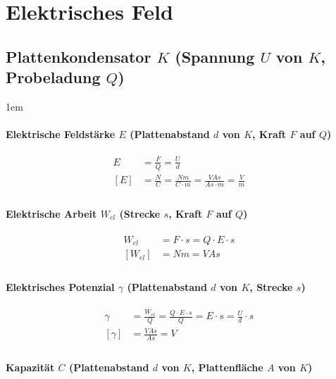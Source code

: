 \section{Elektrisches Feld}

\subsection{Plattenkondensator $K$ (Spannung $U$ von $K$, Probeladung $Q$)}

\leftskip1em
\paragraph{Elektrische Feldstärke $E$ (Plattenabstand $d$ von $K$, Kraft $F$ auf $Q$)}

\begin{align*}
  E &= \frac{F}{Q} = \frac{U}{d} &\\
  [E] &= \frac{N}{C} = \frac{Nm}{C \cdot m} = \frac{VAs}{As \cdot m} = \frac{V}{m} &\\
\end{align*}

\paragraph{Elektrische Arbeit $W_{el}$ (Strecke $s$, Kraft $F$ auf $Q$)}

\begin{align*}
  W_{el} &= F \cdot s = Q \cdot E \cdot s &\\
  [W_{el}] &= Nm = VAs &\\
\end{align*}

\paragraph{Elektrisches Potenzial $\gamma$ (Plattenabstand $d$ von $K$, Strecke $s$)}

\begin{align*}
  \gamma &= \frac{W_{el}}{Q} = \frac{Q \cdot E \cdot s}{Q} = E \cdot s = \frac{U}{d} \cdot s &\\
  [\gamma] &= \frac{VAs}{As} = V &\\
\end{align*}

\paragraph{Kapazität $C$ (Plattenabstand $d$ von $K$, Plattenfläche $A$ von $K$)}

